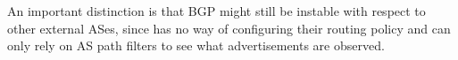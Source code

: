 %
%
%
An important distinction is that BGP might still be instable with respect to other external ASes, since \sysname has no way of configuring their routing policy and can only rely on AS path filters to see what advertisements are observed.



